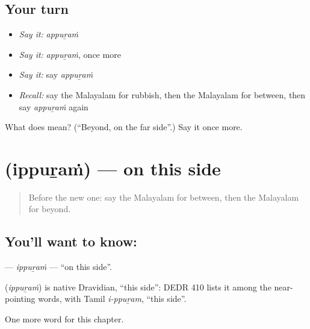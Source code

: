 \subsection*{Your turn}
\begin{itemize}
\raggedright
  \item \emph{Say it:} \emph{appuṟaṁ}
  \item \emph{Say it:} \emph{appuṟaṁ}, once more
  \item \emph{Say it:} say \emph{appuṟaṁ}
  \item \emph{Recall:} say the Malayalam for rubbish, then the Malayalam for between, then say \emph{appuṟaṁ} again
\end{itemize}

\begin{tcolorbox}[breakable,colback=teal!4,colframe=teal!35!black,title={Before you move on}]
What does  mean? (\textquotedblleft{}Beyond, on the far side\textquotedblright{}.) Say it once more.
\end{tcolorbox}
\section[\texorpdfstring{\ml{ഇപ്പുറം} (ippuṟaṁ)}{ഇപ്പുറം (ippuṟaṁ)}]{ (ippuṟaṁ) — on this side}

\label{lesson:ML-C199-ippuram}



\begin{quote}
Before the new one: say the Malayalam for between, then the Malayalam for beyond.
\end{quote}

\subsection*{You'll want to know: }
\textbf{} — \emph{ippuṟaṁ} — \textquotedblleft{}on this side\textquotedblright{}.

\begin{cousinweb}
\textbf{} (\emph{ippuṟaṁ}) is native Dravidian, \textquotedblleft{}this side\textquotedblright{}: DEDR 410 lists it among the near-pointing words, with Tamil \emph{i-ppuṟam}, \textquotedblleft{}this side\textquotedblright{}.
\end{cousinweb}

\begin{grammarlens}[title={What you've built}]
One more word for this chapter.
\end{grammarlens}

